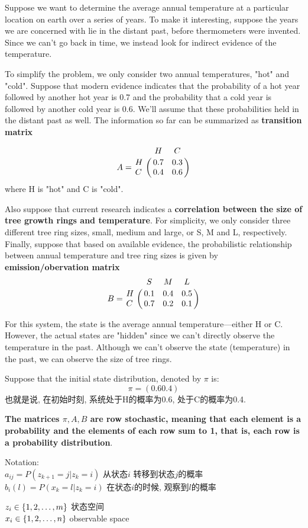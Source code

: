 \documentclass{article}
\begin{document}
Suppose we want to determine the average annual temperature at a particular location on
earth over a series of years. To make it interesting, suppose the years we are concerned with
lie in the distant past, before thermometers were invented. Since we can't go back in time,
we instead look for indirect evidence of the temperature.

To simplify the problem, we only consider two annual temperatures, "hot" and "cold".
Suppose that modern evidence indicates that the probability of a hot year followed by another
hot year is 0.7 and the probability that a cold year is followed by another cold year is 0.6.
We'll assume that these probabilities held in the distant past as well. The information so far can be summarized as \textbf{transition matrix}

$$
A = 
\bordermatrix{
~ & H & C \cr
H & 0.7 & 0.3 \cr
C & 0.4 & 0.6 \cr}
$$
where H is "hot" and C is "cold".

Also suppose that current research indicates a \textbf{correlation between the size of tree growth rings and temperature}. 
For simplicity, we only consider three different tree ring sizes, small, medium and large, or S, M and L, respectively. 
Finally, suppose that based on available evidence, the probabilistic relationship between annual temperature and tree ring sizes is given by
\textbf{emission/obervation matrix}
$$
B = 
\bordermatrix{
~ & S & M & L\cr
H & 0.1 & 0.4 & 0.5 \cr
C & 0.7 & 0.2 & 0.1\cr}
$$

For this system, the state is the average annual temperature—either H or C.\\
However, the actual states are "hidden" since we can't directly observe the temperature in the past.
Although we can't observe the state (temperature) in the past, we can observe the size of tree rings.

Suppose that the initial state distribution, denoted by $\pi$ is:
$$\pi = (0.6 0.4)$$
也就是说, 在初始时刻, 系统处于H的概率为0.6, 处于C的概率为0.4.

\textbf{The matrices $\pi,A,B$ are row stochastic, meaning that each element is a probability and the elements of each row sum to 1, 
that is, each row is a probability distribution}.

Notation:\\
$a_{ij} = P(z_{k+1} = j | z_k = i)$ 从状态$i$ 转移到状态$j$的概率\\
$b_i(l) = P(x_k = l | z_k = i)$ 在状态$i$的时候, 观察到$l$的概率

\noindent
$z_i \in \{1,2,\ldots, m\}$ 状态空间\\
$x_i \in \{1,2,\ldots, n\}$ observable space
\end{document}
